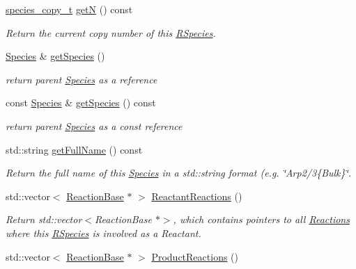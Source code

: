 \begin{DoxyCompactItemize}
\hyperlink{common_8h_a3503f321fd36304ee274141275cca586}{species\-\_\-copy\-\_\-t} \hyperlink{classchem_1_1RSpecies_a5a96cf2a67af375c6471dfa5a21990f8}{get\-N} () const 
\begin{DoxyCompactList}\small\item\em Return the current copy number of this \hyperlink{classchem_1_1RSpecies}{R\-Species}. \end{DoxyCompactList}\item 
\hyperlink{classchem_1_1Species}{Species} \& \hyperlink{classchem_1_1RSpecies_a585ae6da09ba09c824aac7a0fcddd748}{get\-Species} ()
\begin{DoxyCompactList}\small\item\em return parent \hyperlink{classchem_1_1Species}{Species} as a reference \end{DoxyCompactList}\item 
const \hyperlink{classchem_1_1Species}{Species} \& \hyperlink{classchem_1_1RSpecies_a74953c2446c0261fc5732a63e3392a15}{get\-Species} () const 
\begin{DoxyCompactList}\small\item\em return parent \hyperlink{classchem_1_1Species}{Species} as a const reference \end{DoxyCompactList}\item 
std\-::string \hyperlink{classchem_1_1RSpecies_af4e42cfd817f05b2de169275e3496399}{get\-Full\-Name} () const 
\begin{DoxyCompactList}\small\item\em Return the full name of this \hyperlink{classchem_1_1Species}{Species} in a std\-::string format (e.\-g. \char`\"{}\-Arp2/3\{\-Bulk\}\char`\"{}. \end{DoxyCompactList}\item 
std\-::vector$<$ \hyperlink{classchem_1_1ReactionBase}{Reaction\-Base} $\ast$ $>$ \hyperlink{classchem_1_1RSpecies_a777147e17b1ef1e733cd35a1d2aa98ba}{Reactant\-Reactions} ()
\begin{DoxyCompactList}\small\item\em Return std\-::vector$<$\-Reaction\-Base $\ast$$>$, which contains pointers to all \hyperlink{classchem_1_1Reaction}{Reactions} where this \hyperlink{classchem_1_1RSpecies}{R\-Species} is involved as a Reactant. \end{DoxyCompactList}\item 
std\-::vector$<$ \hyperlink{classchem_1_1ReactionBase}{Reaction\-Base} $\ast$ $>$ \hyperlink{classchem_1_1RSpecies_ab978fcc67f44cf5a2aba3d8281f57dcf}{Product\-Reactions} ()

\end{DoxyCompactItemize}
